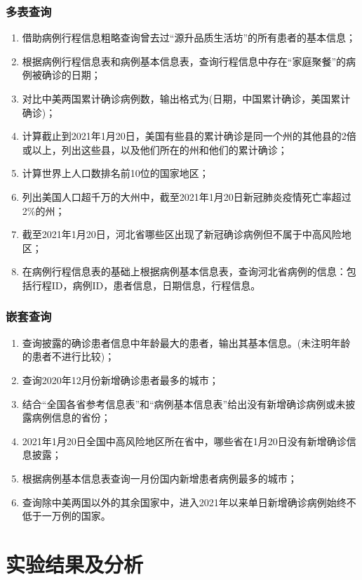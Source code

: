 \documentclass[lang=cn,11pt,a4paper,cite=authornum]{paper}
\begin{document}
\subsubsection{多表查询}

\begin{enumerate}
    \item 借助病例行程信息粗略查询曾去过“源升品质生活坊”的所有患者的基本信息；
    \item 根据病例行程信息表和病例基本信息表，查询行程信息中存在“家庭聚餐”的病例被确诊的日期；
    \item 对比中美两国累计确诊病例数，输出格式为(日期，中国累计确诊，美国累计确诊)；
    \item 计算截止到2021年1月20日，美国有些县的累计确诊是同一个州的其他县的2倍或以上，列出这些县，以及他们所在的州和他们的累计确诊；
    \item 计算世界上人口数排名前10位的国家地区；
    \item 列出美国人口超千万的大州中，截至2021年1月20日新冠肺炎疫情死亡率超过2\%的州；
    \item 截至2021年1月20日，河北省哪些区出现了新冠确诊病例但不属于中高风险地区；
    \item 在病例行程信息表的基础上根据病例基本信息表，查询河北省病例的信息：包括行程ID，病例ID，患者信息，日期信息，行程信息。
\end{enumerate}

\subsubsection{嵌套查询}

\begin{enumerate}
    \item 查询披露的确诊患者信息中年龄最大的患者，输出其基本信息。(未注明年龄的患者不进行比较)；
    \item 查询2020年12月份新增确诊患者最多的城市；
    \item 结合“全国各省参考信息表”和“病例基本信息表”给出没有新增确诊病例或未披露病例信息的省份；
    \item 2021年1月20日全国中高风险地区所在省中，哪些省在1月20日没有新增确诊信息披露；
    \item 根据病例基本信息表查询一月份国内新增患者病例最多的城市；
    \item 查询除中美两国以外的其余国家中，进入2021年以来单日新增确诊病例始终不低于一万例的国家。
\end{enumerate}

\section{实验结果及分析}
\end{document}
